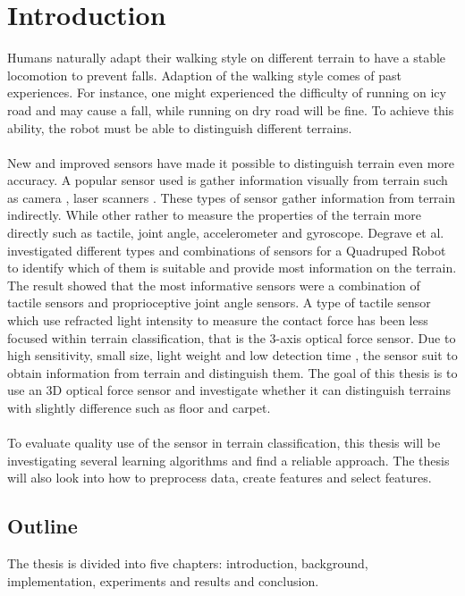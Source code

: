 \documentclass[USenglish]{ifimaster}  %
\begin{document}
	
\mainmatter{}
\chapter{Introduction}                  %
Humans naturally adapt their walking style on different terrain to have a stable locomotion to prevent falls. Adaption of the walking style comes of past experiences. For instance, one might experienced the difficulty of running on icy road and may cause a fall, while running on dry road will be fine. To achieve this ability, the robot must be able to distinguish different terrains.
	\\
\\ 
New and improved sensors have made it possible to distinguish terrain even more accuracy. A popular sensor used is gather information visually from terrain such as camera \cite{littleDog}, laser scanners \cite{4651026}. These types of sensor gather information from terrain indirectly. While other rather to measure the properties of the terrain more directly such as tactile, joint angle, accelerometer and gyroscope. Degrave et al.\cite{6784609} investigated different types and combinations of sensors for a Quadruped Robot to identify which of them is suitable and provide most information on the terrain. The result showed that the most informative sensors were a combination of tactile sensors and proprioceptive joint angle sensors. A type of tactile sensor which use refracted light intensity to measure the contact force has been less focused within terrain classification, that is the 3-axis optical force sensor. Due to high sensitivity, small size, light weight and low detection time \cite{Dutta2016}, the sensor suit to obtain information from terrain and distinguish them. The goal of this thesis is to use an 3D optical force sensor and investigate whether it can distinguish terrains with slightly difference such as floor and carpet.
\\
\\
To evaluate quality use of the sensor in terrain classification, this thesis will be investigating several learning algorithms and find a reliable approach. The thesis will also look into how to preprocess data, create features and select features.
	
	
\section{Outline}
The thesis is divided into five chapters: introduction, background, implementation,  experiments and results and conclusion. 
	
\end{document}
